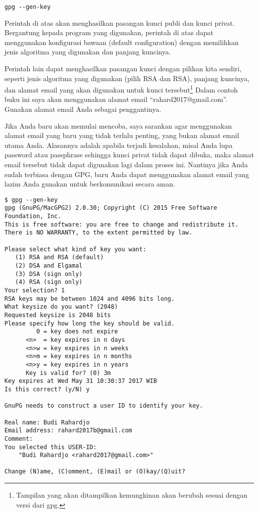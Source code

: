 \begin{verbatim}
gpg --gen-key
\end{verbatim}

Perintah di atas akan menghasilkan pasangan kunci publi dan kunci privat.
Bergantung kepada program yang digunakan, perintah di atas dapat menggunakan
konfigurasi bawaan (default configuration) dengan memilihkan jenis algoritma
yang digunakan dan panjang kuncinya.

Perintah lain dapat menghasilkan pasangan kunci dengan pilihan kita sendiri,
seperti jenis algoritma yang digunakan (pilih RSA dan RSA), panjang kuncinya,
dan alamat email yang akan digunakan untuk kunci tersebut\footnote{Tampilan yang akan 
ditampilkan kemungkinan akan berubah sesuai dengan versi dari gpg.}
Dalam contoh buku ini saya akan
menggunakan alamat email ``rahard2017@gmail.com''. Gunakan alamat email Anda
sebagai penggantinya.

Jika Anda baru akan memulai mencoba, saya sarankan agar menggunakan alamat
email yang baru yang tidak terlalu penting, yang bukan alamat email utama Anda.
Alasannya adalah apabila terjadi kesalahan, misal Anda lupa password atau
passphrase sehingga kunci privat tidak dapat dibuka, maka alamat email
tersebut tidak dapat digunakan lagi dalam proses ini.
Nantinya jika Anda sudah terbiasa dengan GPG, baru Anda dapat menggunakan
alamat email yang lazim Anda gunakan untuk berkomunikasi secara aman.

\begin{verbatim}
$ gpg --gen-key
gpg (GnuPG/MacGPG2) 2.0.30; Copyright (C) 2015 Free Software Foundation, Inc.
This is free software: you are free to change and redistribute it.
There is NO WARRANTY, to the extent permitted by law.

Please select what kind of key you want:
   (1) RSA and RSA (default)
   (2) DSA and Elgamal
   (3) DSA (sign only)
   (4) RSA (sign only)
Your selection? 1
RSA keys may be between 1024 and 4096 bits long.
What keysize do you want? (2048)
Requested keysize is 2048 bits
Please specify how long the key should be valid.
         0 = key does not expire
      <n>  = key expires in n days
      <n>w = key expires in n weeks
      <n>m = key expires in n months
      <n>y = key expires in n years
      Key is valid for? (0) 3m
Key expires at Wed May 31 10:30:37 2017 WIB
Is this correct? (y/N) y

GnuPG needs to construct a user ID to identify your key.

Real name: Budi Rahardjo
Email address: rahard2017b@gmail.com
Comment:
You selected this USER-ID:
    "Budi Rahardjo <rahard2017@gmail.com>"

Change (N)ame, (C)omment, (E)mail or (O)kay/(Q)uit?
\end{verbatim}

